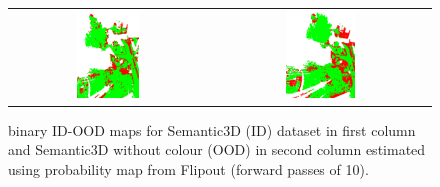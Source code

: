 \begin{figure}[h!]
\begin{tabular}{cc}
            \includegraphics[width=0.33\textwidth, height=0.18\textheight]{images/ood_imgs/sem3d_of/prob/fout_sem3d_OOD_3.pdf}&
            \includegraphics[width=0.33\textwidth, height=0.18\textheight]{images/ood_imgs/sem3d_of/prob/fout_sem3d_of_OOD_3.pdf}\\
        \end{tabular}
        \caption{binary ID-OOD maps for Semantic3D (ID) dataset in first column and Semantic3D without colour (OOD) in second column estimated using probability map from Flipout (forward passes of 10).}
        \label{fig:fout_oodmap_sem3d_OF_prob}
    \end{figure} 

